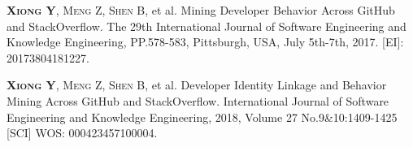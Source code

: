 
\begin{publications}{99}
    \item\textsc{\textbf{Xiong Y}, Meng Z, Shen B}, et al. {Mining Developer Behavior Across GitHub and StackOverflow}. The 29th International Journal of Software Engineering and Knowledge Engineering, PP.578-583, Pittsburgh, USA, July 5th-7th, 2017. [EI]: 20173804181227.
    \item\textsc{\textbf{Xiong Y}, Meng Z, Shen B}, et al. {Developer Identity Linkage and Behavior Mining Across GitHub and StackOverflow}. International Journal of Software Engineering and Knowledge Engineering, 2018, Volume 27 No.9\&10:1409-1425 [SCI] WOS: 000423457100004.
\end{publications}
